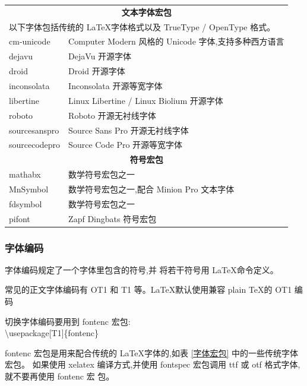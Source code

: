 \documentclass[a4paper]{ctexart}
\begin{document}
\begin{table}[H]
\begin{tabular}{ll}
            \midrule
            \multicolumn{2}{c}{\bf{文本字体宏包}}\\
            \multicolumn{2}{l}{以下字体包括传统的 \LaTeX 字体格式以及 TrueType / OpenType 格式。}\\
            \midrule
            cm-unicode      &Computer Modern 风格的 Unicode 字体,支持多种西方语言   \\
            dejavu          &DejaVu 开源字体                                     \\
            droid           &Droid 开源字体                                      \\
            inconsolata     &Inconsolata 开源等宽字体                             \\
            libertine       &Linux Libertine / Linux Biolium 开源字体            \\
            roboto          &Roboto 开源无衬线字体                                \\
            sourcesanspro   &Source Sans Pro 开源无衬线字体                       \\
            sourcecodepro   &Source Code Pro 开源等宽字体                         \\
            \midrule
            \multicolumn{2}{c}{\bf{符号宏包}}\\
            mathabx     &数学符号宏包之一                         \\
            MnSymbol    &数学符号宏包之一,配合 Minion Pro 文本字体  \\
            fdsymbol    &数学符号宏包之一                         \\
            pifont      &Zapf Dingbats 符号宏包                  \\
            \bottomrule
        \end{tabular}
    \end{table}
    \subsubsection{字体编码}
    字体编码规定了一个字体里包含的符号,并 将若干符号用 \LaTeX 命令定义。\par
    常见的正文字体编码有 OT1 和 T1 等。\LaTeX 默认使用兼容 plain \TeX 的 OT1 编码\par
    切换字体编码要用到 fontenc 宏包:\\
    \textbackslash usepackage[T1]\{fontenc\}\par
    fontenc 宏包是用来配合传统的 \LaTeX 字体的,如表 \ref{字体宏包} 中的一些传统字体宏包。%
    如果使用 xelatex 编译方式,并使用 fontspec 宏包调用 ttf 或 otf 格式字体,就不要再使用 fontenc 宏 包。
\end{document}
